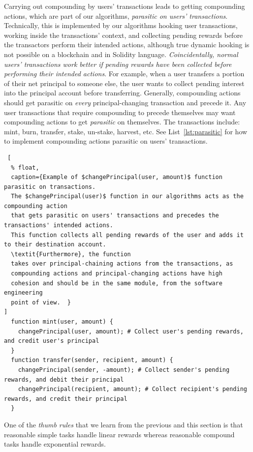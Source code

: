 \documentclass{article}
\begin{document}
Carrying out compounding by users' transactions leads to getting compounding actions,
which are part of our algorithms, \textit{parasitic on users' transactions}.
Technically, this is implemented by our algorithms hooking user transactions, 
working inside the transactions' context, and collecting pending rewards before the transactors 
perform their intended actions, 
although true dynamic hooking is not possible on a blockchain and in Solidity language.
\textit{Coincidentally, normal users' transactions work better if pending rewards have 
been collected before performing their intended actions}. 
For example, when a user transfers a portion of their net principal to someone else, 
the user wants to collect pending interest into the principal account before transferring.
Generally, compounding actions should get parasitic on \textit{every} principal-changing 
transaction and precede it. Any user transactions that require compounding 
to precede themselves may want compounding actions to get \textit{parasitic} on themselves.
The transactions include: mint, burn, transfer, stake, un-stake, harvest, etc.
See List~\ref{lst:parasitic} for how to implement compounding actions parasitic on 
users' transactions.
\newline

\label{lst:parasitic}
\begin{lstlisting} [
  % float,
  caption={Example of $changePrincipal(user, amount)$ function parasitic on transactions. 
  The $changePrincipal(user)$ function in our algorithms acts as the compounding action 
  that gets parasitic on users' transactions and precedes the transactions' intended actions. 
  This function collects all pending rewards of the user and adds it to their destination account.
  \textit{Furthermore}, the function
  takes over principal-chaining actions from the transactions, as 
  compounding actions and principal-changing actions have high 
  cohesion and should be in the same module, from the software engineering 
  point of view.  }
]
  function mint(user, amount) {
    changePrincipal(user, amount); # Collect user's pending rewards, and credit user's principal
  }
  function transfer(sender, recipient, amount) {
    changePrincipal(sender, -amount); # Collect sender's pending rewards, and debit their principal
    changePrincipal(recipient, amount); # Collect recipient's pending rewards, and credit their principal
  }
\end{lstlisting}

One of the \textit{thumb rules} that we learn from the previous  
and this section is that reasonable simple tasks handle linear rewards 
whereas reasonable compound tasks handle exponential rewards.
\end{document}
